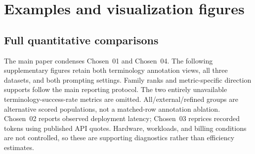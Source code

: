 \documentclass[11pt]{article}
\begin{document}
\section{Examples and visualization figures}

\subsection{Full quantitative comparisons}
The main paper condenses Chosen~01 and Chosen~04. The following supplementary figures retain both
terminology annotation views, all three datasets, and both prompting settings. Family ranks and
metric-specific direction supports follow the main reporting protocol. The two entirely unavailable
terminology-success-rate metrics are omitted. All/external/refined groups are alternative scored
populations, not a matched-row annotation ablation. Chosen~02 reports observed deployment latency;
Chosen~03 reprices recorded tokens using published API quotes. Hardware, workloads, and billing
conditions are not controlled, so these are supporting diagnostics rather than efficiency estimates.
\end{document}
